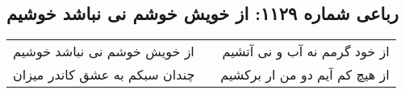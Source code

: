 \begin{center}
\section*{رباعی شماره ۱۱۲۹: از خویش خوشم نی نباشد خوشیم}
\label{sec:1129}
\begin{longtable}{l p{0.5cm} r}
از خویش خوشم نی نباشد خوشیم
&&
از خود گرمم نه آب و نی آتشیم
\\
چندان سبکم به عشق کاندر میزان
&&
از هیچ کم آیم دو من ار برکشیم
\\
\end{longtable}
\end{center}
